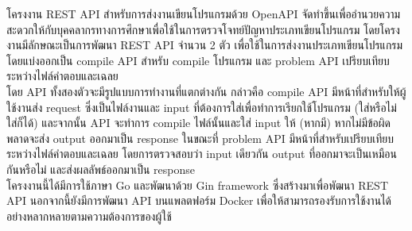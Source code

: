 
โครงงาน REST API สําหรับการส่งงานเขียนโปรแกรมด้วย OpenAPI จัดทําขึ้นเพื่ออํานวยความสะดวกให้กับบุคคลากรทางการศึกษาเพื่อใช้ในการตรวจโจทย์ปัญหาประเภทเขียนโปรแกรม โดยโครงงานมีลักษณะเป็นการพัฒนา REST API จํานวน 2 ตัว เพื่อใช้ในการส่งงานประเภทเขียนโปรแกรม โดยแบ่งออกเป็น compile API สําหรับ compile โปรแกรม และ problem API เปรียบเทียบระหว่างไฟล์คำตอบและเฉลย \\
\indent โดย API ทั้งสองตัวจะมีรูปแบบการทํางานที่แตกต่างกัน กล่าวคือ compile API มีหน้าที่สําหรับให้ผู้ใช้งานส่ง request ซึ่งเป็นไฟล์งานและ input ที่ต้องการใส่เพื่อทำการเรียกใช้โปรแกรม (ใส่หรือไม่ใส่ก็ได้) และจากนั้น API จะทำการ compile ไฟล์นั้นและใส่ input ให้ (หากมี) หากไม่มีข้อผิดพลาดจะส่ง output ออกมาเป็น response ในขณะที่ problem API มีหน้าที่สําหรับเปรียบเทียบระหว่างไฟล์คำตอบและเฉลย โดยการตรวจสอบว่า input เดียวกัน output ที่ออกมาจะเป็นเหมือนกันหรือไม่ และส่งผลลัพธ์ออกมาเป็น response \\
\indent โครงงานนี้ได้มีการใช้ภาษา Go และพัฒนาด้วย Gin framework ซึ่งสร้างมาเพื่อพัฒนา REST API นอกจากนี้ยังมีการพัฒนา API บนแพลตฟอร์ม Docker เพื่อให้สามารถรองรับการใช้งานได้อย่างหลากหลายตามความต้องการของผู้ใช้


